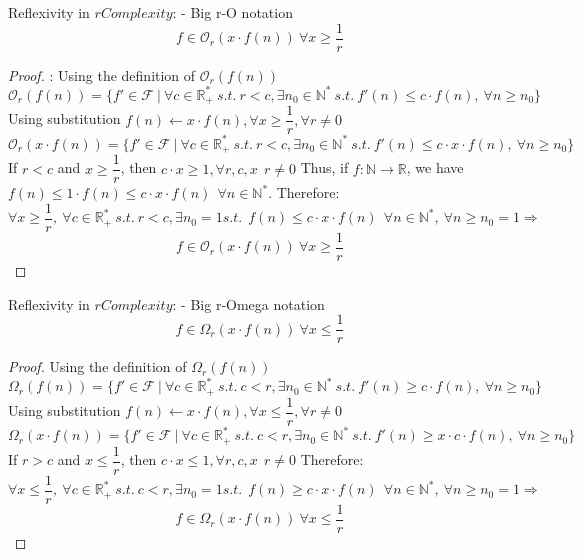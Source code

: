  
\begin{theorem} Reflexivity in $rComplexity$: - Big r-O notation 
 \[ f \in \mathcal{O}_{r} \left( x \cdot f(n) \right)\ \forall x \geq \dfrac{1}{r} \]
\end{theorem}
\begin{proof}:
    Using the definition of $ \mathcal{O}_{r}(f(n))$
  \[\mathcal{O}_{r}(f(n)) = \lbrace f' \in \mathcal{F}\ |\ \forall c  \in \mathbb{R}^{*}_{+} \ s.t.\  r<c, \exists n_{0} \in \mathbb{N}^{*}\ s.t.\  f'(n) \leq c \cdot f(n),\  \forall n \geq n_{0} \rbrace\]
    Using substitution $ f(n) \longleftarrow x \cdot f(n), \forall x \geq \dfrac{1}{r}, \forall r \neq 0$
  \[\mathcal{O}_{r}(x \cdot f(n)) = \lbrace f' \in \mathcal{F}\ |\ \forall c  \in \mathbb{R}^{*}_{+} \ s.t.\  r<c, \exists n_{0} \in \mathbb{N}^{*}\ s.t.\  f'(n) \leq c \cdot x \cdot f(n),\  \forall n \geq n_{0} \rbrace\]
If $r<c$ and $x \geq \dfrac{1}{r}$, then $c \cdot x \geq 1, \forall r,c,x\ \ r \neq 0$
   	Thus, if $f:\mathbb{N}\longrightarrow\mathbb{R}$, we have $ f(n) \leq 1 \cdot f(n) \leq  c \cdot x\cdot f(n) \ \ \forall n \in \mathbb{N}^{*}$. 
   	Therefore:
   	\[\forall x \geq \dfrac{1}{r}, \ \forall c \in \mathbb{R}^{*}_{+} \ s.t.\  r<c , \exists n_{0} = 1  s.t.\  \  f(n) \leq  c \cdot x\cdot f(n) \ \ \forall n \in \mathbb{N}^{*} ,\  \forall n \geq n_{0}=1 \Rightarrow \]
 \[ f \in \mathcal{O}_{r} \left( x \cdot f(n) \right)\ \forall x \geq \dfrac{1}{r} \]
\end{proof}

\begin{theorem} Reflexivity in $rComplexity$: - Big r-Omega notation 
 \[ f \in \Omega_{r} \left( x \cdot f(n) \right)\ \forall x \leq \dfrac{1}{r} \]
\end{theorem} 
\begin{proof} 
    Using the definition of $\Omega_{r}(f(n))$
  \[\Omega_{r}(f(n)) = \lbrace f' \in \mathcal{F}\ |\ \forall c  \in \mathbb{R}^{*}_{+} \ s.t.\  c<r, \exists n_{0} \in \mathbb{N}^{*}\ s.t.\  f'(n) \geq c \cdot f(n),\  \forall n \geq n_{0} \rbrace\]
    Using substitution $ f(n) \longleftarrow x \cdot f(n), \forall x \leq \dfrac{1}{r}, \forall r \neq 0$
  \[\Omega_{r}(x \cdot f(n)) = \lbrace f' \in \mathcal{F}\ |\ \forall c  \in \mathbb{R}^{*}_{+} \ s.t.\  c<r, \exists n_{0} \in \mathbb{N}^{*}\ s.t.\  f'(n) \geq x \cdot c \cdot f(n),\  \forall n \geq n_{0} \rbrace\]
If $r>c$ and $x \leq \dfrac{1}{r}$, then $c \cdot x \leq 1, \forall r,c,x\ \ r \neq 0$
   	Therefore:
   	\[\forall x \leq \dfrac{1}{r}, \ \forall c \in \mathbb{R}^{*}_{+} \ s.t.\  c<r , \exists n_{0} = 1  s.t.\  \  f(n) \geq  c \cdot x\cdot f(n) \ \ \forall n \in \mathbb{N}^{*} ,\  \forall n \geq n_{0}=1 \Rightarrow \]
 \[ f \in \Omega_{r} \left( x \cdot f(n) \right)\ \forall x \leq \dfrac{1}{r} \]
\end{proof}


